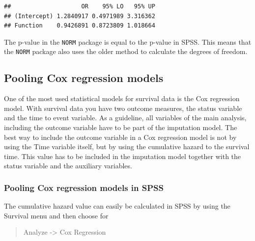 \documentclass[
]{book}
\begin{document}
\begin{verbatim}
##                    OR    95% LO   95% UP
## (Intercept) 1.2840917 0.4971989 3.316362
## Function    0.9426891 0.8723809 1.018664
\end{verbatim}

The p-value in the \texttt{NORM} package is equal to the p-value in
SPSS. This means that the \texttt{NORM} package also uses the older
method to calculate the degrees of freedom.

\hypertarget{pooling-cox-regression-models}{%
\subsection{Pooling Cox regression
models}\label{pooling-cox-regression-models}}

One of the most used statistical models for survival data is the Cox
regression model. With survival data you have two outcome measures, the
status variable and the time to event variable. As a guideline, all
variables of the main analysis, including the outcome variable have to
be part of the imputation model. The best way to include the outcome
variable in a Cox regression model is not by using the Time variable
itself, but by using the cumulative hazard to the survival time. This
value has to be included in the imputation model together with the
status variable and the auxiliary variables.

\hypertarget{pooling-cox-regression-models-in-spss}{%
\subsubsection{Pooling Cox regression models in
SPSS}\label{pooling-cox-regression-models-in-spss}}

The cumulative hazard value can easily be calculated in SPSS by using
the Survival menu and then choose for

\begin{quote}
Analyze -\textgreater{} Cox Regression
\end{quote}
\end{document}
